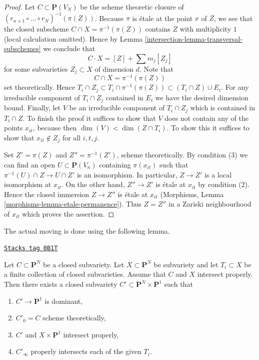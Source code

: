 \begin{proof}
\medskip\noindent
Let $C \subset \mathbf{P}(V_N)$ be the scheme theoretic closure of
$(r_{n + 1} \circ \ldots \circ r_N)^{-1}(\pi(Z))$. Because $\pi$
is \'etale at the point $x$ of $Z$, we see that the closed subscheme
$C \cap X = \pi^{-1}(\pi(Z))$
contains $Z$ with multiplicity $1$ (local calculation omitted).
Hence by Lemma \ref{intersection-lemma-transversal-subschemes} we conclude that
$$
C \cdot X = [Z] + \sum m_j[Z_j]
$$
for some subvarieties $Z_j \subset X$ of dimension $d$. Note that
$$
C \cap X = \pi^{-1}(\pi(Z))
$$
set theoretically. Hence
$T_i \cap Z_j \subset T_i \cap \pi^{-1}(\pi(Z)) \subset (T_i \cap Z) \cup E_i$.
For any irreducible component of $T_i \cap Z_j$ contained in $E_i$ we
have the desired dimension bound. Finally, let $V$ be an irreducible
component of $T_i \cap Z_j$ which is contained in $T_i \cap Z$. To finish
the proof it suffices to show that $V$ does not contain any of the
points $x_{it}$, because then $\dim(V) < \dim(Z \cap T_i)$.
To show this it suffices to show that $x_{it} \not \in Z_j$
for all $i, t, j$.

\medskip\noindent
Set $Z' = \pi(Z)$ and $Z'' = \pi^{-1}(Z')$, scheme theoretically. By
condition (3) we can find an open $U \subset \mathbf{P}(V_n)$ containing
$\pi(x_{it})$ such that $\pi^{-1}(U) \cap Z \to U \cap Z'$ is an isomorphism.
In particular, $Z \to Z'$ is a local isomorphism at $x_{it}$.
On the other hand, $Z'' \to Z'$ is \'etale at $x_{it}$ by condition (2).
Hence the closed immersion $Z \to Z''$ is \'etale at $x_{it}$
(Morphisms, Lemma \ref{morphisms-lemma-etale-permanence}).
Thus $Z = Z''$ in a Zariski neighbourhood of $x_{it}$ which proves
the assertion.
\end{proof}

The actual moving is done using the following lemma.

\begin{lemma}[Move]
\label{intersection-lemma-move}
\href{https://stacks.math.columbia.edu/tag/0B1T}{\texttt{Stacks tag 0B1T}}

Let $C \subset \mathbf{P}^N$ be a closed subvariety.
Let $X \subset \mathbf{P}^N$ be subvariety and let $T_i \subset X$
be a finite collection of closed subvarieties.
Assume that $C$ and $X$ intersect properly.
Then there exists a closed subvariety
$C' \subset \mathbf{P}^N \times \mathbf{P}^1$ such that
\begin{enumerate}
\item $C' \to \mathbf{P}^1$ is dominant,
\item $C'_0 = C$ scheme theoretically,
\item $C'$ and $X \times \mathbf{P}^1$ intersect properly,
\item $C'_\infty$ properly intersects each of the given $T_i$.
\end{enumerate}
\end{lemma}


